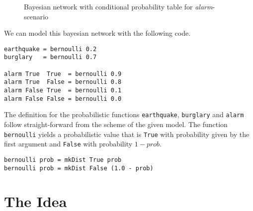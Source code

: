 \documentclass[
12pt, %
a4paper, %
oneside, %
]{llncs}
\newcommand{\code}[1]{{\texttt{#1}}}
\begin{document}
\begin{figure}
\caption{Bayesian network with conditional probability table for \emph{alarm}-scenario}
\end{figure}

We can model this bayesian network with the following code. %

\begin{verbatim}
earthquake = bernoulli 0.2
burglary   = bernoulli 0.7

alarm True  True  = bernoulli 0.9
alarm True  False = bernoulli 0.8
alarm False True  = bernoulli 0.1
alarm False False = bernoulli 0.0
\end{verbatim}

The definition for the probabilistic functions \code{earthquake},
\code{burglary} and \code{alarm} follow straight-forward from the
scheme of the given model. %
The function \code{bernoulli} yields a probabilistic value that is
\code{True} with probability given by the first argument and
\code{False} with probability $1 - prob$. %

\begin{verbatim}
bernoulli prob = mkDist True prob
bernoulli prob = mkDist False (1.0 - prob)
\end{verbatim}

\section{The Idea}
\end{document}
